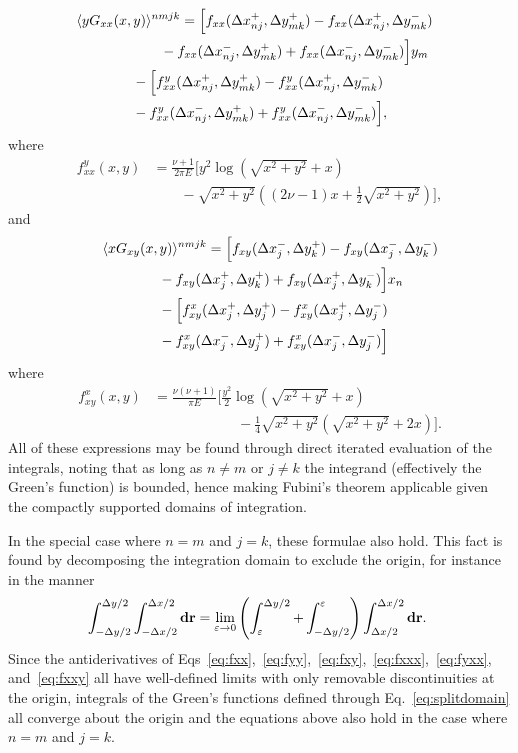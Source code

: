 \documentclass[aps,prl,reprint,twocolumn,groupedaddress,showpacs]{revtex4-1}
\def\d{{\bf d}}
\def\r{{\bf r}}
\begin{document}
\begin{align}
\lefteqn{\langle yG_{xx}(x,y) \rangle^{nmjk} = \Big[f_{xx}( \Delta x_{nj}^+,\Delta y_{mk}^+) - f_{xx}( \Delta x_{nj}^+,\Delta y_{mk}^-) } \nonumber\\
&\qquad\qquad\qquad-f_{xx}(\Delta x_{nj}^-, \Delta y_{mk}^+) + f_{xx}(\Delta x_{nj}^- , \Delta y_{mk}^-)  \Big] y_m\nonumber\\
&\qquad\qquad - \Big[ f^y_{xx}(\Delta x_{nj}^+,\Delta y_{mk}^+) - f^y_{xx}(\Delta x_{nj}^+,\Delta y_{mk}^-)\nonumber\\
&\qquad\qquad - f^y_{xx}(\Delta x_{nj}^-,\Delta y_{mk}^+) + f^y_{xx}(\Delta x_{nj}^-,\Delta y_{mk}^-)  \Big],
\end{align}
where
\begin{align}
f^y_{xx}(x,y) &=\frac{\nu+1}{2\pi E} \Bigg[y^2\log\left(\sqrt{x^2+y^2}+x \right)  \nonumber\\
&\qquad- \sqrt{x^2+y^2}\left((2\nu-1)x + \frac{1}{2}\sqrt{x^2+y^2} \right)  \Bigg], \label{eq:fyxx}
\end{align}
and
\begin{align}
\lefteqn{\langle xG_{xy}(x,y) \rangle^{nmjk} = \Big[ f_{xy}(\Delta x_j^-, \Delta y_k^+) - f_{xy}(\Delta x_j^-,\Delta y_k^-) } \nonumber\\
&\qquad\qquad- f_{xy}(\Delta x_j^+,\Delta y_k^+) + f_{xy} (\Delta x_j^+,\Delta y_k^-) \Big]x_n\nonumber\\
&\qquad\qquad -   \Big[ f_{xy}^x(\Delta x_j^+,\Delta y_j^+) - f_{xy}^x(\Delta x_j^+,\Delta y_j^-) \nonumber\\
&\qquad\qquad- f_{xy}^x(\Delta x_j^-,\Delta y_j^+) + f_{xy}^x(\Delta x_j^-,\Delta y_j^-)\Big]
\end{align}
where
\begin{align}
f_{xy}^x(x,y) &=\frac{\nu(\nu+1)}{\pi E}\Big[ \frac{y^2}{2}\log\left(\sqrt{x^2+y^2} +x \right) \nonumber\\
&\qquad\qquad\qquad-\frac{1}{4}\sqrt{x^2+y^2}\left(\sqrt{x^2+y^2}+2x\right) \Big]. \label{eq:fxxy}
\end{align}
All of these expressions may be found through direct iterated evaluation of the integrals, noting that
as long as $n\neq m$ or $j\neq k$ the integrand (effectively the Green's function) is bounded, hence making
Fubini's theorem applicable given the compactly supported domains of integration.

In the 
special case where $n=m$ and $j=k$, these formulae also hold. This fact is found by decomposing the integration domain to
exclude the origin, for instance in the manner
\begin{equation}
\int_{ -\Delta y/2 }^{\Delta y/2 }\int_{- \Delta x/2 }^{\Delta x/2 } \d\r = \lim_{\varepsilon\to0} \left( \int_\varepsilon^{\Delta y/2}  +  \int_{-\Delta y/2}^\varepsilon   \right)\int_{\Delta x/2}^{\Delta x/2} \d\r.~\label{eq:splitdomain}
\end{equation}
Since the antiderivatives of Eqs~\ref{eq:fxx},~\ref{eq:fyy},~\ref{eq:fxy},~\ref{eq:fxxx},~\ref{eq:fyxx}, and~\ref{eq:fxxy} all have well-defined limits with only removable discontinuities at the origin,  integrals of the Green's functions defined through Eq.~\ref{eq:splitdomain} all converge about the origin and the equations above also hold in the case where $n=m$ and $j=k$.
\end{document}
